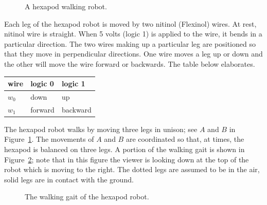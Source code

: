 \begin{enumerate}
\begin{figure}[ht]
\caption{A hexapod walking robot.}
\label{fig:hexapod}
\end{figure}

Each leg of the hexapod robot is moved by two nitinol (Flexinol) wires.  
At rest, nitinol wire is straight.  When 5 volts (logic 1) is applied to 
the wire, it bends in a particular direction.  The two wires making up
a particular leg are positioned so that they move in perpendicular
directions.  One wire moves a leg up or down and the other will move 
the wire forward or backwards.  The table below elaborates.

\begin{tabular}{l|l|l}
wire   & logic 0 & logic 1	\\ \hline
$w_0$  & down	 & up		\\ \hline
$w_1$  & forward & backward	\\ 
\end{tabular}

The hexapod robot walks by moving three legs in unison; see $A$ and
$B$ in Figure~\ref{fig:hexapod}.  The movements of $A$ and $B$ are
coordinated so that, at times, the hexapod is balanced on three legs.
A portion of the walking gait is shown in Figure~\ref{fig:hexgate};
note that in this figure the viewer is looking down at the top of the 
robot which is moving to the right.  The dotted legs are assumed to be in
the air, solid legs are in contact with the ground.

\begin{figure}[ht]
\caption{The walking gait of the hexapod robot.}
\label{fig:hexgate}
\end{figure}


\end{enumerate}
